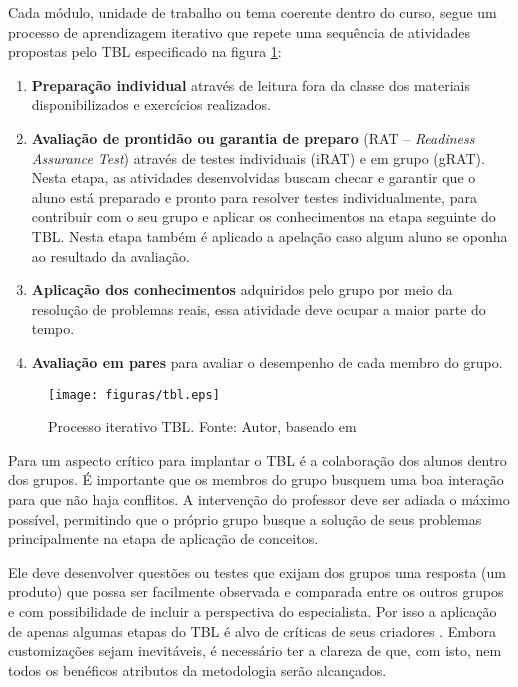 Cada módulo, unidade de trabalho ou tema coerente dentro do curso, segue um processo de aprendizagem iterativo que repete uma sequência de atividades propostas pelo TBL especificado na figura \ref{fig:tbl}:

\begin{enumerate}
  \item \textbf{Preparação individual} através de leitura fora da classe dos materiais disponibilizados e exercícios realizados.
  \item \textbf{Avaliação de prontidão ou garantia de preparo} (RAT – \textit{Readiness Assurance Test}) através de testes individuais (iRAT) e em grupo (gRAT). Nesta etapa, as atividades desenvolvidas buscam checar e garantir que o aluno está preparado e pronto para resolver testes individualmente, para contribuir com o seu grupo e aplicar os conhecimentos na etapa seguinte do TBL. Nesta etapa também é aplicado a apelação caso algum aluno se oponha ao resultado da avaliação.
  \item \textbf{Aplicação dos conhecimentos} adquiridos pelo grupo por meio da resolução de problemas reais, essa atividade deve ocupar a maior parte do tempo.
  \item \textbf{Avaliação em pares} para avaliar o desempenho de cada membro do grupo.
\end{enumerate}

\begin{figure}[h!]
	\centering
  \texttt{[image: figuras/tbl.eps]}
  \caption[Processo iterativo TBL.]{Processo iterativo TBL. Fonte: Autor, baseado em \cite{bollela}}
	\label{fig:tbl}
\end{figure}

Para \cite{bollela} um aspecto crítico para implantar o TBL é a colaboração dos alunos dentro dos grupos. É importante que os membros do grupo busquem uma boa interação para que não haja conflitos. A intervenção do professor deve ser adiada o máximo possível, permitindo que o próprio grupo busque a solução de seus problemas principalmente na etapa de aplicação de conceitos.

Ele deve desenvolver questões ou testes que exijam dos grupos uma resposta (um produto) que possa ser facilmente observada e comparada entre os outros grupos e com possibilidade de incluir a perspectiva do especialista. Por isso a aplicação de apenas algumas etapas do TBL é alvo de críticas de seus criadores \cite{sweet}. Embora customizações sejam inevitáveis, é necessário ter a clareza de que, com isto, nem todos os benéficos atributos da metodologia serão alcançados.

